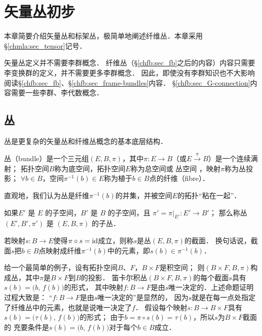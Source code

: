 
\chapter{矢量丛初步}\label{chfb}

本章简要介绍矢量丛和标架丛，极简单地阐述纤维丛．本章采用\S\ref{chmla:sec_tensor}记号．

矢量丛定义并不需要李群概念．
纤维丛（\S\ref{chfb:sec_fb}之后的内容）内容只需要李变换群的定义，并不需要更多李群概念．
因此，即使没有李群知识也不大影响阅读\S\ref{chfb:sec_fb}、\S\ref{chfb:sec_frame-bundles}内容．
\S\ref{chfb:sec_G-connection}内容需要一些李群、李代数概念．

\section{丛}
丛是更复杂的矢量丛和纤维丛概念的基本底层结构．

\begin{definition}
    {\heiti 丛}（bundle）是一个三元组$(E, B, \pi)$，其中$\pi: E\to B$（或$E\xrightarrow{\pi} B$）是一个连续满射；
    拓扑空间$B$称为{\heiti 底空间}，拓扑空间$E$称为{\heiti 总空间}或 {\heiti 丛空间} ，映射$\pi$称为{\heiti 丛投影}；
    $\forall b\in B$，空间$\pi^{-1}(b)\in E$称为植于$ b\in B$点的{\heiti 纤维}（fibre）．
\end{definition}
直观地，我们认为丛是纤维$\pi^{-1}(b)$的并集，并被空间$E$的拓扑“粘在一起”．


\begin{definition}
     如果$E'$ 是 $E$ 的子空间，$B'$ 是 $B$ 的子空间，且 $ \pi' = \pi |_{E'}: E'\to B'$；
     那么称丛 $(E',  B',\pi')$ 是 $(E, B,\pi)$ 的{\heiti 子丛}．
\end{definition}

\begin{definition}
    若映射$s: B\to E$使得$\pi \circ s = {\rm id}$成立，则称$s$是丛$(E, B,\pi)$的{\heiti 截面}．
    换句话说，截面$s$把$b\in B$点映射成纤维$\pi^{-1}(b)$中的元素，即$s(b)\in \pi^{-1}(b)$．
\end{definition}
    


给一个最简单的例子，设有拓扑空间$B$、$F$，$B\times F$是积空间；
则$(B\times F, B,\pi)$构成丛，其中$\pi$是$B\times F$到$B$的投影．
笛卡尔积丛$(B \times F, B,\pi)$的每个截面$s$具有$s(b) = \bigl(b,\, f(b)\bigr)$的形式，
其中映射$f: B\to F$是由$s$唯一决定的．上述命题证明过程大致是：
“$f: B\to F$是由$s$唯一决定的”是显然的，
因为$s$就是在每一点处指定了纤维丛中的元素，也就是说唯一决定了$f$．
假设每个映射$s: B\to B\times F$具有$s(b) = \bigl(\tau(b), \, f (b)\bigr)$的形式；
由于$b=\pi \circ s(b) = \tau(b)$，所以$s$为$B\times F$截面的
充要条件是$s(b) = \bigl(b,\, f(b)\bigr)$对于每个$b\in B$成立．

